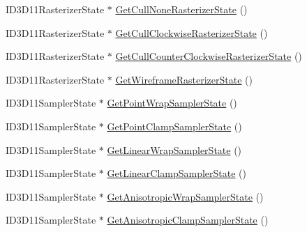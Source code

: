 \begin{DoxyCompactItemize}
\item 
I\+D3\+D11\+Rasterizer\+State $\ast$ \hyperlink{structmage_1_1_rendering_state_cache_af9c689e85b54cf0af4018c20e3ab61a1}{Get\+Cull\+None\+Rasterizer\+State} ()
\item 
I\+D3\+D11\+Rasterizer\+State $\ast$ \hyperlink{structmage_1_1_rendering_state_cache_a4055aaf84813811b94ed741c07cbee3c}{Get\+Cull\+Clockwise\+Rasterizer\+State} ()
\item 
I\+D3\+D11\+Rasterizer\+State $\ast$ \hyperlink{structmage_1_1_rendering_state_cache_aa41c6a83a929c09f040dddbd4e21d5fb}{Get\+Cull\+Counter\+Clockwise\+Rasterizer\+State} ()
\item 
I\+D3\+D11\+Rasterizer\+State $\ast$ \hyperlink{structmage_1_1_rendering_state_cache_a86d51235df703c952a1e50d95eae4244}{Get\+Wireframe\+Rasterizer\+State} ()
\item 
I\+D3\+D11\+Sampler\+State $\ast$ \hyperlink{structmage_1_1_rendering_state_cache_a4d1b6eef773700e3fb80195f93b484f9}{Get\+Point\+Wrap\+Sampler\+State} ()
\item 
I\+D3\+D11\+Sampler\+State $\ast$ \hyperlink{structmage_1_1_rendering_state_cache_aabf172b1363478d2570a242303e38838}{Get\+Point\+Clamp\+Sampler\+State} ()
\item 
I\+D3\+D11\+Sampler\+State $\ast$ \hyperlink{structmage_1_1_rendering_state_cache_abcd4b98f9c0170466551901845c86824}{Get\+Linear\+Wrap\+Sampler\+State} ()
\item 
I\+D3\+D11\+Sampler\+State $\ast$ \hyperlink{structmage_1_1_rendering_state_cache_a8fd935f6eaca18ee85eef482c4b0acf8}{Get\+Linear\+Clamp\+Sampler\+State} ()
\item 
I\+D3\+D11\+Sampler\+State $\ast$ \hyperlink{structmage_1_1_rendering_state_cache_a183a1b919105bd1758cc6fb6cdeab018}{Get\+Anisotropic\+Wrap\+Sampler\+State} ()
\item 
I\+D3\+D11\+Sampler\+State $\ast$ \hyperlink{structmage_1_1_rendering_state_cache_ad4b0894beba4725e53a5a7ca3b9085cb}{Get\+Anisotropic\+Clamp\+Sampler\+State} ()
\end{DoxyCompactItemize}
